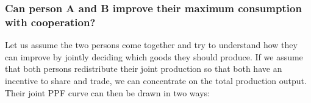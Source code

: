 	\subsubsection{Can person A and B improve their maximum consumption with cooperation?}
	Let us assume the two persons come together and try to understand how they can improve by jointly deciding which goods they should produce. If we assume that both persons redistribute their joint production so that both have an incentive to share and trade, we can concentrate on the total production output. Their joint PPF curve can then be drawn in two ways: 
	
